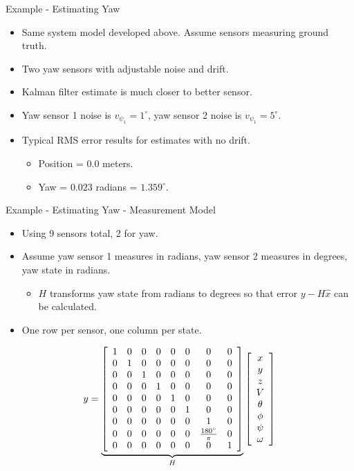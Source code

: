\documentclass[hyperref={pdfpagelabels=false}]{beamer}
\begin{document}
\begin{frame}{Example - Estimating Yaw}
\begin{itemize}
\item Same system model developed above. Assume sensors measuring ground truth.
\item Two yaw sensors with adjustable noise and drift.
\item Kalman filter estimate is much closer to better sensor.
\item Yaw sensor 1 noise is $v_{\psi_1} = 1^\circ$, yaw sensor 2 noise is $v_{\psi_1} = 5^\circ$.
\item Typical RMS error results for estimates with no drift.
\begin{itemize}
\item Position = $0.0$ meters.
\item Yaw = $0.023$ radians = $1.359^\circ$.
\end{itemize}
\end{itemize}
\end{frame}

\begin{frame}{Example - Estimating Yaw - Measurement Model}
\begin{itemize}
\item Using 9 sensors total, 2 for yaw.
\item Assume yaw sensor 1 measures in radians, yaw sensor 2 measures in degrees, yaw state in radians.
\begin{itemize}
\item $H$ transforms yaw state from radians to degrees so that error $y-H\hat{x}$ can be calculated.
\end{itemize}
\item One row per sensor, one column per state.
\end{itemize}
\begin{align*}
y = \underbrace{\left[\begin{array}{c c c c c c c c}
1 & 0 & 0 & 0 & 0 & 0 & 0 & 0 \\
0 & 1 & 0 & 0 & 0 & 0 & 0 & 0 \\
0 & 0 & 1 & 0 & 0 & 0 & 0 & 0 \\
0 & 0 & 0 & 1 & 0 & 0 & 0 & 0 \\
0 & 0 & 0 & 0 & 1 & 0 & 0 & 0 \\
0 & 0 & 0 & 0 & 0 & 1 & 0 & 0 \\
0 & 0 & 0 & 0 & 0 & 0 & 1 & 0 \\
0 & 0 & 0 & 0 & 0 & 0 & \frac{180^\circ}{\pi} & 0 \\
0 & 0 & 0 & 0 & 0 & 0 & 0 & 1
\end{array}\right]}_{H}
\left[\begin{array}{c}
x \\ y \\ z \\ V \\ \theta \\ \phi \\ \psi \\ \omega
\end{array}\right]
\end{align*}
\end{frame}
\end{document}

